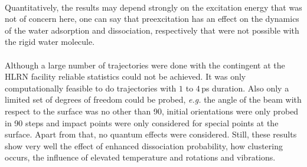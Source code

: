 \documentclass[11pt,DIV=13,BCOR=5mm,a4paper,headinclude]{scrbook}
\begin{document}
\\
Quantitatively, the results may depend strongly on the excitation energy that was not of concern here, one can say that preexcitation has an effect on the dynamics of the water adsorption and dissociation, respectively that were not possible with the rigid water molecule.
\\
\\
Although a large number of trajectories were done with the contingent at the HLRN facility reliable statistics could not be achieved.
It was only computationally feasible to do trajectories with $1$ to $4\,$ps duration.
Also only a limited set of degrees of freedom could be probed, \textit{e.g.} the angle of the beam with respect to the surface was no other than 90\textdegree{}, initial orientations were only probed in 90\textdegree{} steps and impact points were only considered for special points at the surface.
Apart from that, no quantum effects were considered.
Still, these results show very well the effect of enhanced dissociation probability, how clustering occurs, the influence of elevated temperature and rotations and vibrations\cite{Heiden0001_2018}.
\clearpage

\end{document}
